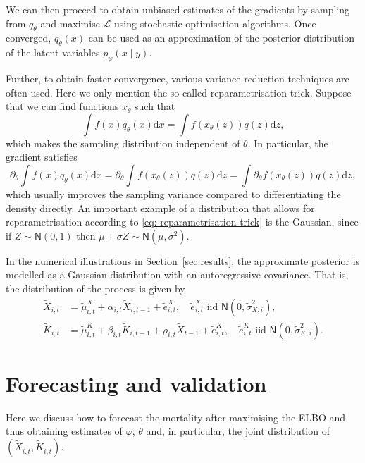 \documentclass[preprint,12pt]{elsarticle}
\def\pp{\partial}
\def\dd{\ensuremath{\mathrm{d}}}
\begin{document}
We can then proceed to obtain unbiased estimates of the gradients by sampling from $q_\theta$ and maximise $\mathcal L$ using stochastic optimisation algorithms. Once converged,  $q_\theta(x)$ can be used as an approximation of the posterior distribution of the latent variables $p_\psi(x\mid y)$.

Further, to obtain faster convergence, various variance reduction techniques are often used. Here we only mention the so-called reparametrisation trick. Suppose that we can find functions $x_\theta$ such that
\begin{equation}\label{eq: reparametrisation trick}
	\int f(x) q_\theta(x)\dd x = \int f(x_\theta(z))q(z)\dd z,
\end{equation}
which makes the sampling distribution independent of $\theta$. In particular, the gradient satisfies
\begin{equation}
	\partial_\theta \int f(x) q_\theta(x)\dd x = \partial_\theta \int f(x_\theta(z))q(z)\dd z = \int \pp_\theta f(x_\theta(z))q(z)\dd z,
\end{equation}
which usually improves the sampling variance compared to differentiating the density directly. An important example of a distribution that allows for reparametrisation according to \eqref{eq: reparametrisation trick} is the Gaussian, since if $Z\sim \mathsf N(0,1)$ then $\mu + \sigma Z\sim \mathsf N (\mu,\sigma^2)$.

In the numerical illustrations in Section~\ref{sec:results}, the approximate posterior is modelled as a Gaussian distribution with an autoregressive covariance. That is, the distribution of the process is given by
\begin{align}
	\tilde X_{i,t} &= \tilde\mu^X_{i,t } + \alpha_{i,t}\tilde X_{i,t-1}  + \tilde e^X_{i,t},\quad \tilde e^X_{i,t} \text{ iid } \mathsf N(0,\tilde\sigma^2_{X,i}),\\
	\tilde K_{i,t} &= \tilde \mu^K_{i,t} + \beta_{i,t}\tilde K_{i,t-1} + \rho_{i,t}\tilde X_{t-1} + \tilde e^K_{i,t},\quad \tilde e^K_{i,t} \text{ iid } \mathsf N(0,\tilde \sigma^2_{K,i}).
\end{align}

\section{Forecasting and validation}\label{sec:forecastValidation}
Here we discuss how to forecast the mortality after maximising the ELBO and thus obtaining estimates of $\varphi$, $\theta$ and, in particular, the joint distribution of $(\tilde X_{i,\bar t},\tilde K_{i,\bar t})$.
\end{document}
